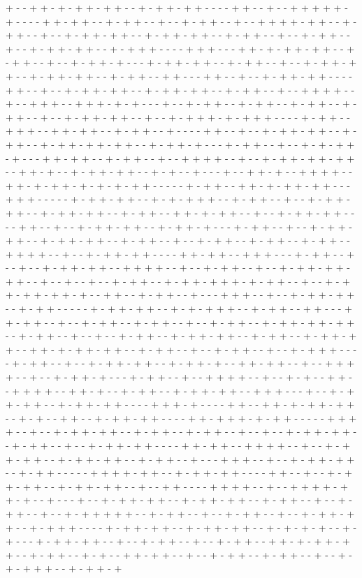 + - - + + - + - + + - + + - - + - + + - + + - - - - + + - - + - - + + + + + - + - - - - + + - + + - - + - + + - - + - - + - + + - - + - - + + + + - + + - - + - + + - - + - - + - + + - + + - - + - + + - + + - - + - + + - - + - - + - + + - - + - - + - + + - + + - - + - + + + - - - - + + + - - - + + - + - + + - + + - - + - + + - - + - - + - + + - + - - - + - + + - + + - - + - + + - - + - - + - + + - + + - - + - + + - + + - - + - + + - - + + - - - + + - - + - - + - + + - + + - - - - + + - - + - - + - + + - + + - - + - + + - + + - - + - + + - - + - - + + + + - - + - - + + + - - + + + - + - + - - - + - - + - + + - - + - + + - - + - + + - - + - + + - - + - - + - + + - + + - - + - - + - + + + - + - + + + - - - - + - + + - - + + + - - + + - + + - - + - + + - - + - - - - + + - - + - - + - + + - + + - - + - + + - - + - + + - + + - + + - - + - + + - + - - - + - + + - - + - - + - + - + + - + - - - + + - + + - - + - + + - - + - - + + + + - - + - - + - + + - + + - + + - - + + - + - - + - + + - + + - - + - + - - + - - - + - - + + - + - - + + + + - - + + - + - + + - + - + - + - + + - - - - - + - + + - - + + - + - + + - + + - - - + + + - - - - - + - + + - + + - - + - + - + + + - - + - + + - - + - - + - + + - + + - - + - + + - + + - - + - + + - - + + - + - + + - - + - - + - + + - + + - - - - + + - - + - - + - + + - + + - - + - + + - + - - - + - + + - - + - - + - + + - + + - - + - + + - + + - - + - + + - - + - - + - + + - - + - + + - - + - + + - - + + + + - - + - - + - + + - + + - - - - + + - + + - - + + + - - - + - + + - - + - - + - - + - + + - + + - - + + + + - - + - - + - + + - - + - - + - + + - + + - + + - - + - - + - - + - - + - + + - - + - + + - + + + - + - + + - - + - - + - + + - + + - + + - + - - + + - - + - + + - - + - - - + + + - - + - - + - + + - + + - - + - + + - - - - - + - + + - + + - - + - + - + + + - - + - + + - - + + - - - + + - + + - - + - - + - + + - - + - + + - - + - - + - + + - - + - + + - + + - + + - - + - + + - - + - - + - - + - + + - - + - + + - + + - - + - + + - - + - + + - + + - - + + - + - + + - + + - - + - + + - - + - - + - + + - - + - - + - + + + - - - - + - + + - - + - - + - + + - + + - - + - + + - + - - + + - + + - - + - - + + + + - - + - - + - + + - + - - - + - + + - - + - - + + + + - - + - - + - + - - + + - - + + + + - - + + - + - - + - + + - - + - + + - + + - - + + + - - - + - - + - + + - + + - - + - + + - + + - - - - + + + - + - - - - + + - - + + - + - + + - + + - - + - + - - + + - - + - + + - + + - - - - + + - + + + - + - + + - - - - - + + + + - - + - - + - + + - + + - - + - + + - - + - + + - - + - - + - - + - + + - + + - - + - + + - - + - - + - + + - + + - - - - + + - + + - - + + + + - - + - - + - + + - + + - - + - + + - + + - - + - + + - - + - - - + + + - - + - - + - + + - + + - - + - + + - - - - - + + + + - + + - - + - + + - + + - - - - + + - - + - - + - + + - + + - - + - + + - + + - - + - - + + - - - - + + + + - - + - - + + + + - + + - + - - + - - - + - - + - + + - + + - - + - + + - + + - - + - + + - - + - - + - + + - - + - - + - + + + + + - - + - + + - - + - - + - + + - - + - - + - + + - + + - - + - + + + - - - - + - + + - + + - - + - + + - + + - - + - + - + - + - - + - + - - - + - + + - + + - - + - - + - + + - - + - - + - + + - - + + - + - + + - + + - - + - + + - - + - + - - + + - + + - - + - - + - + + - - + - + + - - + - - + - + - + + + - - + - + + - + 